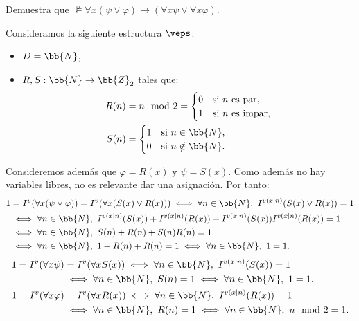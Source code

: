 \begin{ejercicio}\label{ej:2.7}
    Demuestra que $\not\models \forall x(\psi \vee \varphi) \rightarrow (\forall x \psi \vee \forall x \varphi)$.

    Consideramos la siguiente estructura $\veps$:
    \begin{itemize}
        \item $D = \bb{N}$,
        \item $R,S:\bb{N}\rightarrow\bb{Z}_2$ tales que:
        \begin{align*}
            R(n) &= n\mod 2=\begin{cases}
                0 & \text{si }n\text{ es par},\\
                1 & \text{si }n\text{ es impar},
            \end{cases}\\
            S(n) &= \begin{cases}
                1 & \text{si }n\in \bb{N},\\
                0 & \text{si }n\notin \bb{N}.
            \end{cases}
        \end{align*}
    \end{itemize}

    Consideremos además que $\varphi=R(x)$ y $\psi=S(x)$. Como además no hay variables libres, no es relevante dar una asignación. Por tanto:
    \begin{align*}
        1 &= I^v(\forall x(\psi \vee \varphi))= I^v(\forall x(S(x) \vee R(x))) \iff \forall n\in\bb{N},\ I^{v(x\mid n)}(S(x) \vee R(x)) = 1\\
        &\iff \forall n\in\bb{N},\ I^{v(x\mid n)}(S(x)) + I^{v(x\mid n)}(R(x)) + I^{v(x\mid n)}(S(x))I^{v(x\mid n)}(R(x)) = 1\\
        &\iff \forall n\in\bb{N},\ S(n) + R(n) + S(n)R(n) = 1\\
        &\iff \forall n\in\bb{N},\ 1 + R(n) + R(n) = 1\iff \forall n\in\bb{N},\ 1 = 1.
    \end{align*}
    \begin{align*}
        1 = I^v(\forall x \psi)&=I^v(\forall x S(x)) \iff \forall n\in\bb{N},\ I^{v(x\mid n)}(S(x)) = 1\\
        &\iff \forall n\in\bb{N},\ S(n) = 1\iff \forall n\in\bb{N},\ 1 = 1.\\
        1 = I^v(\forall x \varphi)&=I^v(\forall x R(x)) \iff \forall n\in\bb{N},\ I^{v(x\mid n)}(R(x)) = 1\\
        &\iff \forall n\in\bb{N},\ R(n) = 1\iff \forall n\in\bb{N},\ n\mod 2 = 1.
    \end{align*}


\end{ejercicio}
